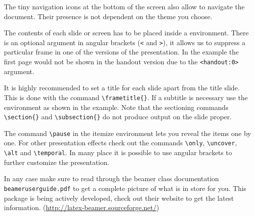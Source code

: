 The tiny navigation icons at the bottom of the screen also allow to
navigate the document. Their presence is not dependent on the theme
you choose.

The contents of each slide or screen has to be placed inside a
 environment. There is an optional argument in angular
brackets (\verb|<| and \verb|>|), it allows us to suppress a particular
frame in one of the versions of the presentation. In the example the
first page would not be shown in the handout version due to the
\verb|<handout:0>| argument.

It is highly recommended to set a title for each slide apart from the
title slide. This is done with the command \verb|\frametitle{}|. If a
subtitle is necessary use the  environment as shown
in the example. Note that the sectioning commands \verb|\section{}|
and \verb|\subsection{}| do not produce output on the slide proper.

The command \verb|\pause| in the itemize environment lets you reveal
the items one by one. For other presentation effects check out the
commands \verb|\only|, \verb|\uncover|, \verb|\alt| and
\verb|\temporal|. In many place it is possible to use angular brackets to
further customize the presentation.

In any case make sure to read through the beamer class documentation
\texttt{beameruserguide.pdf} to get a complete picture of what is in
store for you. This package is being actively developed, check out their website
to get the latest information. (\href{http://latex-beamer.sourceforge.net/}{http://latex-beamer.sourceforge.net/})


